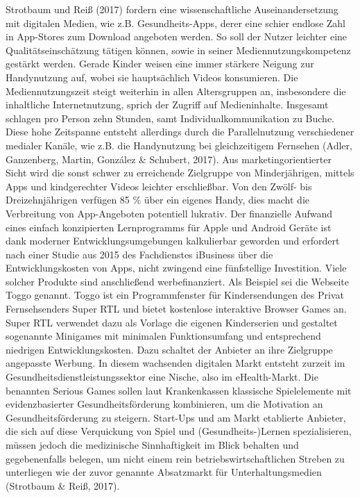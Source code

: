 \documentclass[
  a4paper,
  DIV=11,
  numbers=noendperiod,
  onecolumn,
  oneside,
  a4paper]{scrartcl}
\begin{document}
Strotbaum und Reiß (2017) fordern eine wissenschaftliche
Auseinandersetzung mit digitalen Medien, wie z.B. Gesundheits-Apps,
derer eine schier endlose Zahl in App-Stores zum Download angeboten
werden. So soll der Nutzer leichter eine Qualitätseinschätzung tätigen
können, sowie in seiner Mediennutzungskompetenz gestärkt werden. Gerade
Kinder weisen eine immer stärkere Neigung zur Handynutzung auf, wobei
sie hauptsächlich Videos konsumieren. Die Mediennutzungszeit steigt
weiterhin in allen Altersgruppen an, insbesondere die inhaltliche
Internetnutzung, sprich der Zugriff auf Medieninhalte. Insgesamt
schlagen pro Person zehn Stunden, samt Individualkommunikation zu Buche.
Diese hohe Zeitspanne entsteht allerdings durch die Parallelnutzung
verschiedener medialer Kanäle, wie z.B. die Handynutzung bei
gleichzeitigem Fernsehen (Adler, Ganzenberg, Martin, González \&
Schubert, 2017). Aus marketingorientierter Sicht wird die sonst schwer
zu erreichende Zielgruppe von Minderjährigen, mittels Apps und
kindgerechter Videos leichter erschließbar. Von den Zwölf- bis
Dreizehnjährigen verfügen 85 \% über ein eigenes Handy, dies macht die
Verbreitung von App-Angeboten potentiell lukrativ. Der finanzielle
Aufwand eines einfach konzipierten Lernprogramms für Apple und Android
Geräte ist dank moderner Entwicklungsumgebungen kalkulierbar geworden
und erfordert nach einer Studie aus 2015 des Fachdienstes iBusiness über
die Entwicklungskosten von Apps, nicht zwingend eine fünfstellige
Investition. Viele solcher Produkte sind anschließend werbefinanziert.
Als Beispiel sei die Webseite Toggo genannt. Toggo ist ein
Programmfenster für Kindersendungen des Privat Fernsehsenders Super RTL
und bietet kostenlose interaktive Browser Games an. Super RTL verwendet
dazu als Vorlage die eigenen Kinderserien und gestaltet sogenannte
Minigames mit minimalen Funktionsumfang und entsprechend niedrigen
Entwicklungskosten. Dazu schaltet der Anbieter an ihre Zielgruppe
angepasste Werbung. In diesem wachsenden digitalen Markt entsteht
zurzeit im Gesundheitsdienstleistungssektor eine Nische, also im
eHealth-Markt. Die benannten Serious Games sollen laut Krankenkassen
klassische Spielelemente mit evidenzbasierter Gesundheitsförderung
kombinieren, um die Motivation an Gesundheitsförderung zu steigern.
Start-Ups und am Markt etablierte Anbieter, die sich auf diese
Verquickung von Spiel und (Gesundheits-)Lernen spezialisieren, müssen
jedoch die medizinische Sinnhaftigkeit im Blick behalten und
gegebenenfalls belegen, um nicht einem rein betriebswirtschaftlichen
Streben zu unterliegen wie der zuvor genannte Absatzmarkt für
Unterhaltungsmedien (Strotbaum \& Reiß, 2017).
\end{document}
